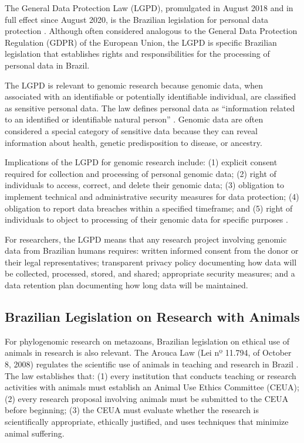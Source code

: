 The General Data Protection Law (LGPD), promulgated in August 2018 and in full effect since August 2020, is the Brazilian legislation for personal data protection \parencite{brasil2018lgpd}. Although often considered analogous to the General Data Protection Regulation (GDPR) of the European Union, the LGPD is specific Brazilian legislation that establishes rights and responsibilities for the processing of personal data in Brazil.

The LGPD is relevant to genomic research because genomic data, when associated with an identifiable or potentially identifiable individual, are classified as sensitive personal data. The law defines personal data as ``information related to an identified or identifiable natural person'' \parencite{brasil2018lgpd}. Genomic data are often considered a special category of sensitive data because they can reveal information about health, genetic predisposition to disease, or ancestry.

Implications of the LGPD for genomic research include: (1) explicit consent required for collection and processing of personal genomic data; (2) right of individuals to access, correct, and delete their genomic data; (3) obligation to implement technical and administrative security measures for data protection; (4) obligation to report data breaches within a specified timeframe; and (5) right of individuals to object to processing of their genomic data for specific purposes \parencite{brasil2018lgpd}.

For researchers, the LGPD means that any research project involving genomic data from Brazilian humans requires: written informed consent from the donor or their legal representatives; transparent privacy policy documenting how data will be collected, processed, stored, and shared; appropriate security measures; and a data retention plan documenting how long data will be maintained.

\subsection{Brazilian Legislation on Research with Animals}

For phylogenomic research on metazoans, Brazilian legislation on ethical use of animals in research is also relevant. The Arouca Law (Lei nº 11.794, of October 8, 2008) regulates the scientific use of animals in teaching and research in Brazil \parencite{brasil2008arouca}. The law establishes that: (1) every institution that conducts teaching or research activities with animals must establish an Animal Use Ethics Committee (CEUA); (2) every research proposal involving animals must be submitted to the CEUA before beginning; (3) the CEUA must evaluate whether the research is scientifically appropriate, ethically justified, and uses techniques that minimize animal suffering.

